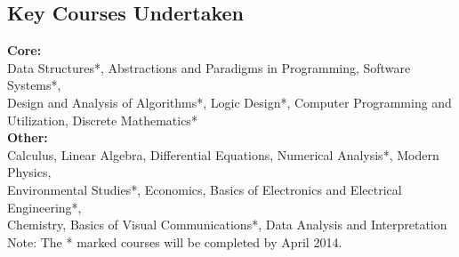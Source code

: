 \documentclass[margin,11pt]{resume}
\begin{document}
\begin{resume}
    \section{\mysidestyle Key Courses Undertaken} 

	\textbf{Core:} \\ Data Structures*, Abstractions and Paradigms in Programming, Software Systems*, \\ Design and Analysis of Algorithms*, Logic Design*, Computer Programming and Utilization, Discrete Mathematics* \\
	\textbf{Other:} \\ Calculus, Linear Algebra, Differential Equations, Numerical Analysis*, Modern Physics, \\ Environmental Studies*, Economics, Basics of Electronics and Electrical Engineering*, \\ Chemistry, Basics of Visual Communications*, Data Analysis and Interpretation
\vspace{1mm}\\%
	Note: The * marked courses will be completed by April 2014.





 









\end{resume}
\end{document}

